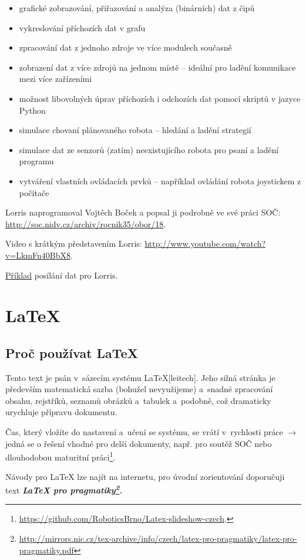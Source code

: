 \begin{itemize}
	\item grafické zobrazování, přiřazování a analýza (binárních) dat z čipů
	\item vykreslování příchozích dat v grafu 
	\item zpracování dat z jednoho zdroje ve více modulech současně
	\item zobrazení dat z více zdrojů na jednom místě -- ideální pro ladění komunikace mezi více zařízeními 
	\item možnost libovolných úprav příchozích i odchozích dat pomocí skriptů v jazyce Python 
	\item simulace chovaní plánovaného robota -- hledání a ladění strategií
	\item simulace dat ze senzorů (zatím) neexistujícího robota pro psaní a ladění programu 
	\item vytváření vlastních ovládacích prvků -- například ovládání robota joystickem z počítače 
	\end{itemize}

 Lorris naprogramoval Vojtěch Boček a popsal ji podrobně ve své práci SOČ:
  \url{http://soc.nidv.cz/archiv/rocnik35/obor/18}.
  
 Video s krátkým představením Lorris: \url{http://www.youtube.com/watch?v=LkmFn40BbX8}.
 
  \hyperref[prog:lorris]{Příklad} posílání dat pro Lorris.
 
\section{\LaTeX} 

\subsection{Proč používat \LaTeX} 

Tento text je psán v~sázecím systému  \LaTeX [leitech]. 
Jeho silná stránka je především matematická sazba 
(bohužel nevyužijeme) a~snadné zpracování obsahu, rejstříků, seznamů obrázků a~tabulek a~podobně, což dramaticky urychluje přípravu dokumentu. 

Čas, který vložíte do nastavení a~učení se systému, se vrátí v~rychlosti práce
 $\rightarrow$ jedná se o řešení vhodné pro delší dokumenty, např. pro soutěž SOČ nebo dlouhodobou maturitní práci\footnote{\url{https://github.com/RoboticsBrno/Latex-slideshow-czech}.}. 
 
Návody pro \LaTeX{}  lze najít na internetu,  pro úvodní zorientování 
 doporučuji text  \bfseries \itshape  \LaTeX{} pro pragmatiky\footnote{\url{http://mirrors.nic.cz/tex-archive/info/czech/latex-pro-pragmatiky/latex-pro-pragmatiky.pdf} }\upshape \mdseries .


